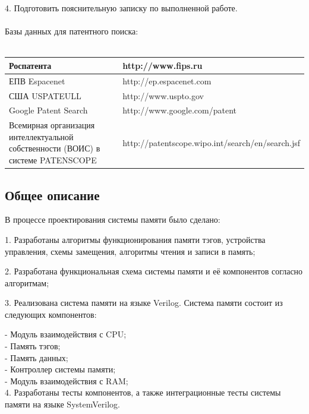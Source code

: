\documentclass[13pt]{article}
\begin{document}
    4. Подготовить пояснительную записку по выполненной работе.\\\\
    Базы данных для патентного поиска:\\\\
    \begin{tabular}{ | p{200pt} | p{220pt} |}
	\hline
	Роспатента & http://www.fips.ru \\ \hline
	ЕПВ Espacenet & http://ep.espacenet.com \\ \hline
    США USPATEULL & http://www.uspto.gov \\ \hline
	Google Patent Search & http://www.google.com/patent \\ \hline
	Всемирная организация интеллектуальной собственности (ВОИС) в системе PATENSCOPE & http://patentscope.wipo.int/search/en/search.jsf \\ \hline
    \end{tabular} 
    \newpage
	\subsection{Общее описание}
	
	В процессе проектирования системы памяти было сделано:
	
	1. Разработаны алгоритмы функционирования памяти тэгов, устройства управления, схемы замещения, алгоритмы чтения и записи в память;
	
	2. Разработана функциональная схема системы памяти и её компонентов согласно алгоритмам;
	
	3. Реализована система памяти на языке Verilog. Система памяти состоит из следующих компонентов:
	
	- Модуль взаимодействия с CPU;\\
	- Память тэгов;\\
	- Память данных;\\
	- Контроллер системы памяти;\\
	- Модуль взаимодействия с RAM;\\
	
	4. Разработаны тесты компонентов, а также интеграционные тесты системы памяти на языке SystemVerilog.
	\newpage
\end{document}
